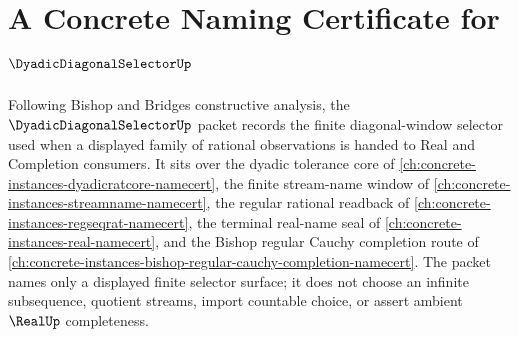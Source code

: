\chapter{A Concrete Naming Certificate for $\DyadicDiagonalSelectorUp$}
\label{ch:concrete-instances-dyadic-diagonal-selector-namecert}

Following Bishop and Bridges constructive analysis, the $\DyadicDiagonalSelectorUp$ packet records the finite diagonal-window selector used when a displayed family of rational observations is handed to Real and Completion consumers. It sits over the dyadic tolerance core of \autoref{ch:concrete-instances-dyadicratcore-namecert}, the finite stream-name window of \autoref{ch:concrete-instances-streamname-namecert}, the regular rational readback of \autoref{ch:concrete-instances-regseqrat-namecert}, the terminal real-name seal of \autoref{ch:concrete-instances-real-namecert}, and the Bishop regular Cauchy completion route of \autoref{ch:concrete-instances-bishop-regular-cauchy-completion-namecert}. The packet names only a displayed finite selector surface; it does not choose an infinite subsequence, quotient streams, import countable choice, or assert ambient $\RealUp$ completeness.

